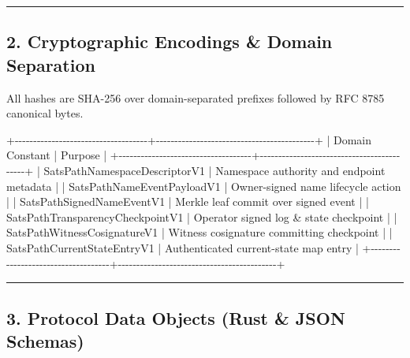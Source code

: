 \documentclass[
]{article}
\newenvironment{Shaded}{}{}
\newcommand{\NormalTok}[1]{#1}
\begin{document}
\begin{center}\rule{0.5\linewidth}{0.5pt}\end{center}

\hypertarget{cryptographic-encodings-domain-separation}{%
\subsection{2. Cryptographic Encodings \& Domain
Separation}\label{cryptographic-encodings-domain-separation}}

All hashes are SHA-256 over domain-separated prefixes followed by RFC
8785 canonical bytes.

\begin{Shaded}
\begin{Highlighting}[]
\NormalTok{+{-}{-}{-}{-}{-}{-}{-}{-}{-}{-}{-}{-}{-}{-}{-}{-}{-}{-}{-}{-}{-}{-}{-}{-}{-}{-}{-}{-}{-}{-}{-}{-}{-}{-}{-}{-}+{-}{-}{-}{-}{-}{-}{-}{-}{-}{-}{-}{-}{-}{-}{-}{-}{-}{-}{-}{-}{-}{-}{-}{-}{-}{-}{-}{-}{-}{-}{-}{-}{-}{-}{-}{-}{-}{-}{-}{-}{-}{-}{-}+}
\NormalTok{| Domain Constant                    | Purpose                                   |}
\NormalTok{+{-}{-}{-}{-}{-}{-}{-}{-}{-}{-}{-}{-}{-}{-}{-}{-}{-}{-}{-}{-}{-}{-}{-}{-}{-}{-}{-}{-}{-}{-}{-}{-}{-}{-}{-}{-}+{-}{-}{-}{-}{-}{-}{-}{-}{-}{-}{-}{-}{-}{-}{-}{-}{-}{-}{-}{-}{-}{-}{-}{-}{-}{-}{-}{-}{-}{-}{-}{-}{-}{-}{-}{-}{-}{-}{-}{-}{-}{-}{-}+}
\NormalTok{| SatsPathNamespaceDescriptorV1      | Namespace authority and endpoint metadata |}
\NormalTok{| SatsPathNameEventPayloadV1         | Owner{-}signed name lifecycle action        |}
\NormalTok{| SatsPathSignedNameEventV1          | Merkle leaf commit over signed event      |}
\NormalTok{| SatsPathTransparencyCheckpointV1   | Operator signed log \& state checkpoint    |}
\NormalTok{| SatsPathWitnessCosignatureV1       | Witness cosignature committing checkpoint |}
\NormalTok{| SatsPathCurrentStateEntryV1        | Authenticated current{-}state map entry     |}
\NormalTok{+{-}{-}{-}{-}{-}{-}{-}{-}{-}{-}{-}{-}{-}{-}{-}{-}{-}{-}{-}{-}{-}{-}{-}{-}{-}{-}{-}{-}{-}{-}{-}{-}{-}{-}{-}{-}+{-}{-}{-}{-}{-}{-}{-}{-}{-}{-}{-}{-}{-}{-}{-}{-}{-}{-}{-}{-}{-}{-}{-}{-}{-}{-}{-}{-}{-}{-}{-}{-}{-}{-}{-}{-}{-}{-}{-}{-}{-}{-}{-}+}
\end{Highlighting}
\end{Shaded}

\begin{center}\rule{0.5\linewidth}{0.5pt}\end{center}

\hypertarget{protocol-data-objects-rust-json-schemas}{%
\subsection{3. Protocol Data Objects (Rust \& JSON
Schemas)}\label{protocol-data-objects-rust-json-schemas}}
\end{document}
